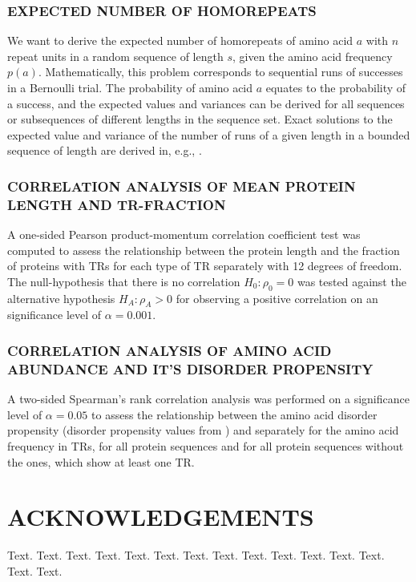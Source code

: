 \documentclass[a4,center,fleqn]{NAR}
\begin{document}
\subsubsection{\MakeUppercase{Expected number of homorepeats}}
We want to derive the expected number of homorepeats of amino acid $a$ with $n$ repeat units in a random sequence of length $s$, given the amino acid frequency $p(a)$. Mathematically, this problem corresponds to sequential runs of successes in a Bernoulli trial. The probability of amino acid $a$ equates to the probability of a success, and the expected values and variances can be derived for all sequences or subsequences of different lengths in the sequence set. Exact solutions to the expected value and variance of the number of runs of a given length in a bounded sequence
of length are derived in, e.g., \cite{Makri2011}.

\subsubsection{\MakeUppercase{Correlation Analysis of Mean Protein Length and TR-fraction}}
A one-sided Pearson product-momentum correlation coefficient test was computed to assess the relationship between the protein length and the fraction of proteins with TRs for each type of TR separately with 12 degrees of freedom. The null-hypothesis that there is no correlation $H_{0}: \rho_{0} = 0$ was tested against the alternative hypothesis $H_{A}: \rho_{A} > 0$ for observing a positive correlation on an significance level of $\alpha = 0.001$.

\subsubsection{\MakeUppercase{Correlation Analysis of Amino Acid Abundance and it's Disorder Propensity}}
A two-sided Spearman's rank correlation analysis was performed on a significance level of $\alpha = 0.05$ to assess the relationship between the amino acid disorder propensity (disorder propensity values from \cite{Uversky2013}) and separately for the amino acid frequency in TRs, for all protein sequences and for all protein sequences without the ones, which show at least one TR.


\section{ACKNOWLEDGEMENTS}

Text. Text. Text. Text. Text. Text. Text. Text. Text. Text. Text.
Text. Text. Text. Text.
\end{document}
